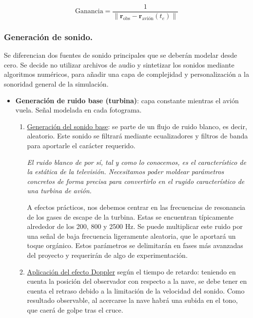 \documentclass[10.5pt]{article}
\begin{document}
	\begin{equation*}
		\text{Ganancia} = \frac{1}{\|\mathbf{r}_{\text{obs}} - \mathbf{r}_{\text{avión}}(t_e)\|}
	\end{equation*}
	
	
	\subsubsection{Generación de sonido.}
	
	Se diferencian dos fuentes de sonido principales que se deberán modelar desde cero. Se decide no utilizar archivos de audio y sintetizar los sonidos mediante algoritmos numéricos, para añadir una capa de complejidad y personalización a la sonoridad general de la simulación.
	
	\begin{itemize}
		\item \textbf{Generación de ruido base (turbina)}: capa constante mientras el avión vuela. Señal modelada en cada fotograma.
		\begin{enumerate}
			\item \uline{Generación del sonido base}: se parte de un flujo de ruido blanco, es decir, aleatorio. Este sonido se filtrará mediante ecualizadores y filtros de banda para aportarle el carácter requerido. 
			
			\textit{El ruido blanco de por sí, tal y como lo conocemos, es el característico de la estática de la televisión. Necesitamos poder moldear parámetros concretos de forma precisa para convertirlo en el rugido característico de una turbina de avión.}
			
			A efectos prácticos, nos debemos centrar en las frecuencias de resonancia de los gases de escape de la turbina. Estas se encuentran típicamente alrededor de los 200, 800 y 2500 Hz. Se puede multiplicar este ruido por una señal de baja frecuencia ligeramente aleatoria, que le aportará un toque orgánico. Estos parámetros se delimitarán en fases más avanzadas del proyecto y requerirán de algo de experimentación.
			
			\item \uline{Aplicación del efecto Doppler} según el tiempo de retardo: teniendo en cuenta la posición del observador con respecto a la nave, se debe tener en cuenta el retraso debido a la limitación de la velocidad del sonido. Como resultado observable, al acercarse la nave habrá una subida en el tono, que caerá de golpe tras el cruce. 
			
			
		\end{enumerate}
		

\end{itemize}
\end{document}
